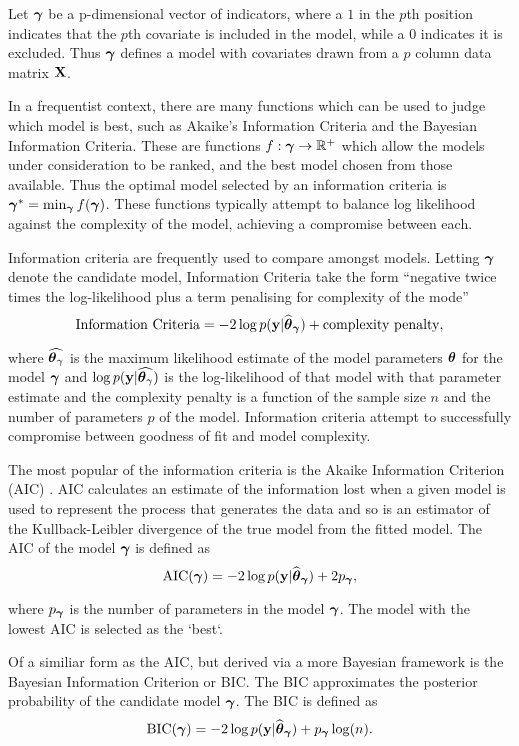 Let ${\boldsymbol \gamma}$ be a p-dimensional vector of indicators, where a $1$ in the $p$th
position indicates that the $p$th covariate is included in the model, while a
$0$ indicates it is excluded. Thus ${\boldsymbol \gamma}$ defines a model with covariates
drawn from a $p$ column data matrix ${\bf X}$.

In a frequentist context, there are many functions which can be used to judge
which model is best, such as Akaike's Information Criteria and the Bayesian
Information Criteria. These are functions $f: {\boldsymbol \gamma} \to {\mathbb{R}}^+$ which allow the
models under consideration to be ranked, and the best model chosen from those
available. Thus the optimal model selected by an information criteria is
${\boldsymbol \gamma}^* = \min_{\boldsymbol \gamma} f({\boldsymbol \gamma})$. These functions typically attempt to
balance log likelihood against the complexity of the model, achieving a
compromise between each.


Information criteria are frequently used to compare amongst models. Letting
${\boldsymbol \gamma}$ denote the candidate model, Information Criteria take the form
``negative twice times the log-likelihood plus a term penalising for complexity
of the mode''
$$
	\text{Information Criteria} = -2 \log p({\bf y} | \widehat{{\boldsymbol \theta}}_{\boldsymbol \gamma}) + \text{complexity penalty},
$$

\noindent where $\widehat{{\boldsymbol \theta}_\gamma}$ is the maximum likelihood estimate of
the model parameters ${\boldsymbol \theta}$ for the model ${\boldsymbol \gamma}$ and $\log p({\bf y} |
\widehat{{\boldsymbol \theta}_\gamma})$ is the log-likelihood of that model with that
parameter estimate and the complexity penalty is a function of the sample size
$n$ and the number of parameters $p$ of the model. Information criteria attempt
to successfully compromise between goodness of fit and model complexity.

The most popular of the information criteria is the Akaike Information Criterion
(AIC) \citep{Akaike1974}. AIC calculates an estimate of the information lost
when a given model is used to represent the process that generates the data and
so is an estimator of the Kullback-Leibler divergence of the true model from the
fitted model. The AIC of the model ${\boldsymbol \gamma}$ is defined as
$$
	\text{AIC}({\boldsymbol \gamma}) = -2 \log p({\bf y} | \widehat{{\boldsymbol \theta}}_{\boldsymbol \gamma}) + 2 p_{\boldsymbol \gamma},
$$

\noindent where $p_{\boldsymbol \gamma}$ is the number of parameters in the model ${\boldsymbol \gamma}$.
The model with the lowest AIC is selected as the `best`.

Of a similiar form as the AIC, but derived via a more Bayesian framework is the
Bayesian Information Criterion or BIC. The BIC approximates the posterior
probability of the candidate model ${\boldsymbol \gamma}$. The BIC is defined as
$$
	\text{BIC}({\boldsymbol \gamma}) = -2 \log p({\bf y} | \widehat{{\boldsymbol \theta}}_{\boldsymbol \gamma}) + p_{\boldsymbol \gamma} \log(n).
$$

